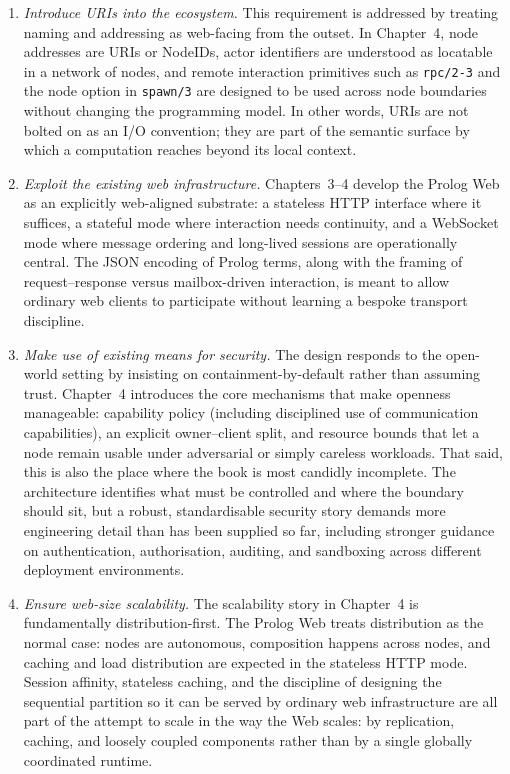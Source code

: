 \begin{enumerate}
\item \emph{Introduce URIs into the ecosystem.} This requirement is addressed by treating naming and addressing as web-facing from the outset. In Chapter~4, node addresses are URIs or NodeIDs, actor identifiers are understood as locatable in a network of nodes, and remote interaction primitives such as \texttt{rpc/2-3} and the node option in \texttt{spawn/3} are designed to be used across node boundaries without changing the programming model. In other words, URIs are not bolted on as an I/O convention; they are part of the semantic surface by which a computation reaches beyond its local context.
\item \emph{Exploit the existing web infrastructure.} Chapters~3--4 develop the Prolog Web as an explicitly web-aligned substrate: a stateless HTTP interface where it suffices, a stateful mode where interaction needs continuity, and a WebSocket mode where message ordering and long-lived sessions are operationally central. The JSON encoding of Prolog terms, along with the framing of request--response versus mailbox-driven interaction, is meant to allow ordinary web clients to participate without learning a bespoke transport discipline.
\item \emph{Make use of existing means for security.} The design responds to the open-world setting by insisting on containment-by-default rather than assuming trust. Chapter~4 introduces the core mechanisms that make openness manageable: capability policy (including disciplined use of communication capabilities), an explicit owner--client split, and resource bounds that let a node remain usable under adversarial or simply careless workloads. That said, this is also the place where the book is most candidly incomplete. The architecture identifies what must be controlled and where the boundary should sit, but a robust, standardisable security story demands more engineering detail than has been supplied so far, including stronger guidance on authentication, authorisation, auditing, and sandboxing across different deployment environments.
\item \emph{Ensure web-size scalability.} The scalability story in Chapter~4 is fundamentally distribution-first. The Prolog Web treats distribution as the normal case: nodes are autonomous, composition happens across nodes, and caching and load distribution are expected in the stateless HTTP mode. Session affinity, stateless caching, and the discipline of designing the sequential partition so it can be served by ordinary web infrastructure are all part of the attempt to scale in the way the Web scales: by replication, caching, and loosely coupled components rather than by a single globally coordinated runtime.

\end{enumerate}
